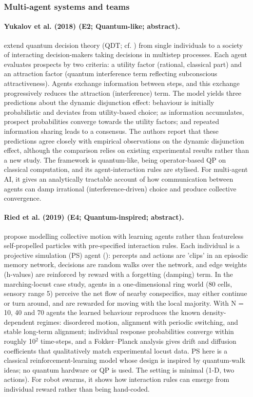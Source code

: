 \documentclass[10pt,a4paper]{article}
\begin{document}
\subsubsection*{Multi-agent systems and teams}
\paragraph{Yukalov et al. (2018) (E2; Quantum-like; abstract).} \citet{Yukalov2018} extend quantum decision theory (QDT; cf. \citet{Yukalov2011}) from single individuals to a society of interacting decision-makers taking decisions in multistep processes. Each agent evaluates prospects by two criteria: a utility factor (rational, classical part) and an attraction factor (quantum interference term reflecting subconscious attractiveness). Agents exchange information between steps, and this exchange progressively reduces the attraction (interference) term. The model yields three predictions about the dynamic disjunction effect: behaviour is initially probabilistic and deviates from utility-based choice; as information accumulates, prospect probabilities converge towards the utility factors; and repeated information sharing leads to a consensus. The authors report that these predictions agree closely with empirical observations on the dynamic disjunction effect, although the comparison relies on existing experimental results rather than a new study. The framework is quantum-like, being operator-based QP on classical computation, and its agent-interaction rules are stylised. For multi-agent AI, it gives an analytically tractable account of how communication between agents can damp irrational (interference-driven) choice and produce collective convergence.

\paragraph{Ried et al. (2019) (E4; Quantum-inspired; abstract).} \citet{Ried2019} propose modelling collective motion with learning agents rather than featureless self-propelled particles with pre-specified interaction rules. Each individual is a projective simulation (PS) agent (\citep{Briegel2012}): percepts and actions are 'clips' in an episodic memory network, decisions are random walks over the network, and edge weights (h-values) are reinforced by reward with a forgetting (damping) term. In the marching-locust case study, agents in a one-dimensional ring world (80 cells, sensory range 5) perceive the net flow of nearby conspecifics, may either continue or turn around, and are rewarded for moving with the local majority. With N = 10, 40 and 70 agents the learned behaviour reproduces the known density-dependent regimes: disordered motion, alignment with periodic switching, and stable long-term alignment; individual response probabilities converge within roughly 10$^2$ time-steps, and a Fokker--Planck analysis gives drift and diffusion coefficients that qualitatively match experimental locust data. PS here is a classical reinforcement-learning model whose design is inspired by quantum-walk ideas; no quantum hardware or QP is used. The setting is minimal (1-D, two actions). For robot swarms, it shows how interaction rules can emerge from individual reward rather than being hand-coded.
\end{document}
